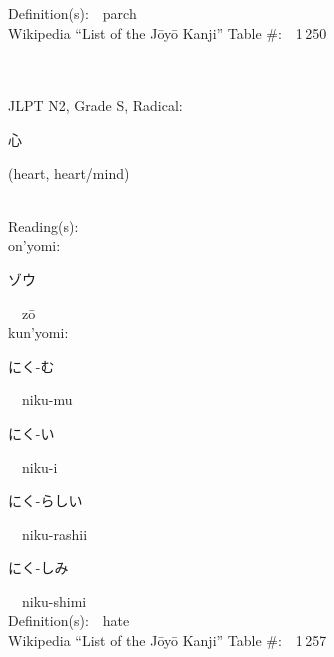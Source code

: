 \begin{multicols}{2}
Definition(s):\ \ parch \\
Wikipedia ``List of the J\=oy\=o Kanji'' Table \#:\ \ 1\,250 \\
\ \ \\
{\fontsize{34pt}{40pt}  }\ \ \\  %
{JLPT N2, Grade S, Radical:\ \ {\begin{CJK}{UTF8}{min} 心 \end{CJK}} (heart, heart/mind) } \\
Reading(s):\ \ \\
{\hspace*{1em}}on'yomi:\ \ \\
{\hspace*{2em}}{\begin{CJK}{UTF8}{min} ゾウ \end{CJK}}\ \ z\=o\ \ \\
{\hspace*{1em}}kun'yomi:\ \ \\
{\hspace*{2em}}{\begin{CJK}{UTF8}{min} にく-む \end{CJK}}\ \ niku-mu\ \ \\
{\hspace*{2em}}{\begin{CJK}{UTF8}{min} にく-い \end{CJK}}\ \ niku-i\ \ \\
{\hspace*{2em}}{\begin{CJK}{UTF8}{min} にく-らしい \end{CJK}}\ \ niku-rashii\ \ \\
{\hspace*{2em}}{\begin{CJK}{UTF8}{min} にく-しみ \end{CJK}}\ \ niku-shimi\ \ \\
Definition(s):\ \ hate \\
Wikipedia ``List of the J\=oy\=o Kanji'' Table \#:\ \ 1\,257 \\
\ \ \\
{\fontsize{34pt}{40pt}  }\ \ \\  %

\end{multicols}
